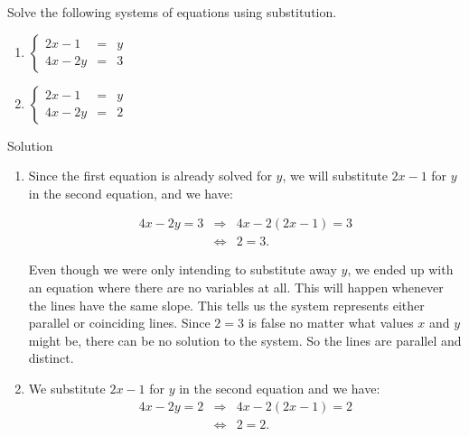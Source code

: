 \begin{example} \label{syst_lin_eq_substitution_ex2}
Solve the following systems of equations using substitution.
\begin{multicols}{2}
\begin{enumerate}
\item $\left\{ \begin{array}{rcl} 2x-1&=&y \\ 4x-2y&=&3  \end{array} \right. $
\item $\left\{ \begin{array}{rcl} 2x-1&=&y  \\ 4x-2y&=&2  \end{array} \right. $
\end{enumerate}
\end{multicols}


Solution 

\begin{enumerate}
\item Since the first equation is already solved for $y$, we will substitute $ 2x-1$ for $y$ in the second equation, and we have:

\begin{eqnarray*}
	4x-2y=3 &\Rightarrow & 4x - 2(2x-1) = 3  \\ 
	&\Leftrightarrow & 2=3. 
\end{eqnarray*}

Even though we were only intending to substitute away $y$, we ended up with an equation where there are no variables at all. This will happen whenever the lines have the same slope. This tells us the system represents either parallel or coinciding lines. Since $2=3$ is false no matter what values $x$ and $y$ might be, there can be no solution to the system. So the lines are parallel and distinct.

\item We substitute $2x-1$ for $y$ in the second equation and we have:
\begin{eqnarray*}
	4x-2y=2 &\Rightarrow & 4x - 2(2x-1) = 2  \\ 
	&\Leftrightarrow & 2=2. 
\end{eqnarray*}


\end{enumerate}
\end{example}
